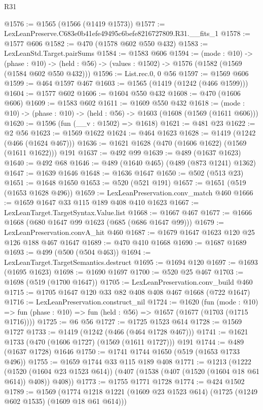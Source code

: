 \begin{lexlean}{R31}
\begin{coremodule}
@1576 := @1565 (@1566 (@1419 @1573))
@1577 := LexLeanPreserve.C683e0b41efe49495c6befe8216727809.R31.__fits_1
@1578 := @1577 @606
@1582 := @470 (@1578 @602 @550 @432)
@1583 := LexLeanStd.Target.pairSums
@1584 := @1583 @606
@1594 := (mode : @10) ->
  (phase : @10) -> (held : @56) -> (values : @1502) -> @1576 (@1582 (@1569 (@1584 @602 @550 @432)))
@1596 := List.rec.{0, 0} @56
@1597 := @1569 @606
@1599 := @464 @1597 @467
@1603 := @1565 (@1419 (@1242 (@466 @1599)))
@1604 := @1577 @602
@1606 := @1604 @550 @432
@1608 := @470 (@1606 @606)
@1609 := @1583 @602
@1611 := @1609 @550 @432
@1618 := (mode : @10) -> (phase : @10) -> (held : @56) -> @1603 (@1608 (@1569 (@1611 @606)))
@1620 := @1596 (fun (__v : @1502) => @1618)
@1621 := @481 @23
@1622 := @2 @56
@1623 := @1569 @1622
@1624 := @464 @1623
@1628 := @1419 (@1242 (@466 (@1624 @467)))
@1636 := @1621 @1628 (@470 (@1606 @1622) (@1569 (@1611 @1622))) @191
@1637 := @492 @99
@1639 := @489 (@1637 @1623)
@1640 := @492 @68
@1646 := @489 (@1640 @465) (@489 (@873 @1241) @1362)
@1647 := @1639 @1646
@1648 := @1636 @1647
@1650 := @502 (@513 @23)
@1651 := @1648 @1650
@1653 := @520 (@521 @191)
@1657 := @1651 (@519 (@1653 @1628 @496))
@1659 := LexLeanPreservation.conv_match @460
@1666 := @1659 @1647 @33 @115 @189 @408 @410 @1623
@1667 := LexLeanTarget.TargetSyntax.Value.list
@1668 := @1667 @467
@1677 := @1666 @1668 (@680 @1647 @99 @1623 (@685 (@686 @1647 @99)))
@1679 := LexLeanPreservation.convA_hit @460
@1687 := @1679 @1647 @1623 @120 @25 @126 @188 @467 @1647
@1689 := @470 @410 @1668
@1690 := @1687 @1689
@1693 := @499 (@500 (@504 @463))
@1694 := LexLeanTarget.TargetSemantics.destruct
@1695 := @1694 @120
@1697 := @1693 (@1695 @1623)
@1698 := @1690 @1697
@1700 := @520 @25 @467
@1703 := @1698 (@519 (@1700 @1647))
@1705 := LexLeanPreservation.conv_build @460
@1715 := @1705 @1647 @120 @33 @82 @408 @408 @467 @1668 (@722 @1647)
@1716 := LexLeanPreservation.construct_nil
@1724 := @1620
    (fun (mode : @10) =>
    fun (phase : @10) => fun (held : @56) => @1657 (@1677 (@1703 (@1715 @1716))))
@1725 := @6 @56
@1727 := @1725 @1523 @614
@1728 := @1569 @1727
@1733 := @1419 (@1242 (@466 (@464 @1728 @467)))
@1741 := @1621 @1733 (@470 (@1606 @1727) (@1569 (@1611 @1727))) @191
@1744 := @489 (@1637 @1728) @1646
@1750 := @1741 @1744 @1650 (@519 (@1653 @1733 @496))
@1755 := @1659 @1744 @33 @115 @189 @408
@1771 := @1213
    (@1222
      (@1520 (@1604 @23 @1523 @614))
      (@407 (@1538 (@407 (@1520 (@1604 @18 @61 @614)) @408)) @408))
@1773 := @1755 @1771 @1728
@1774 := @424 @1502
@1789 := @1569
    (@1774 @1218 @1221 (@1609 @23 @1523 @614) (@1725 (@1249 @602 @1535) (@1609 @18 @61 @614)))

\end{coremodule}
\end{lexlean}
